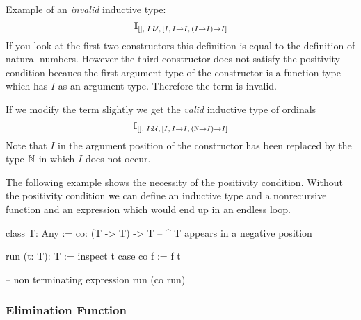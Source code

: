 Example of an \emph{invalid} inductive type:
$$
\mathbb{I}_{[],\; I:{\cal{U}},\, [I,\, I \to I, \, (I \to I) \to I]}
$$
If you look at the first two constructors this definition is equal to the
definition of natural numbers. However the third constructor does not satisfy
the positivity condition becaues the first argument type of the constructor is
a function type which has $I$ as an argument type. Therefore the term is
invalid.

If we modify the term slightly we get the \emph{valid} inductive type of
ordinals
$$
\mathbb{I}_{[],\; I:{\cal{U}},\, [I,\, I \to I, \, ({\mathbb{N}} \to I) \to I]}
$$
Note that $I$ in the argument position of the constructor has been
replaced by the type ${\mathbb{N}}$ in which $I$ does not occur.


The following example shows the necessity of the positivity condition. Without
the positivity condition we can define an inductive type  and a
nonrecursive function  and an expression  which
would end up in an endless loop.
%
\begin{alba}
    class T: Any :=
        co: (T -> T) -> T
        --   ^ T appears in a negative position

    run (t: T): T :=
        inspect t case
            co f :=
                f t

    -- non terminating expression
    run (co run)
\end{alba}




\subsubsection{Elimination Function}

